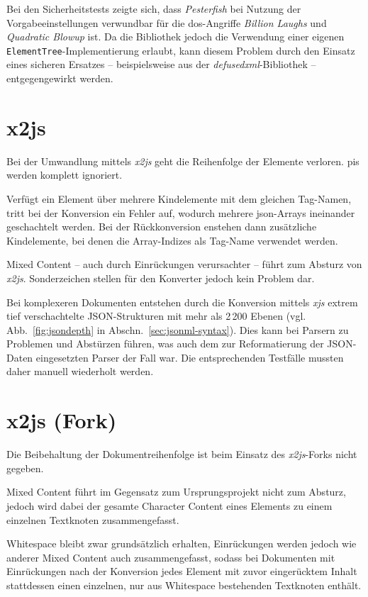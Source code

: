 Bei den Sicherheitstests zeigte sich, dass \emph{Pesterfish} bei Nutzung der Vorgabeeinstellungen verwundbar für die \acrshort{dos}-Angriffe \emph{Billion Laughs} und \emph{Quadratic Blowup} ist. Da die Bibliothek jedoch die Verwendung einer eigenen \texttt{ElementTree}-Implementierung erlaubt, kann diesem Problem durch den Einsatz eines sicheren Ersatzes -- beispielsweise aus der \emph{defusedxml}-Bibliothek -- entgegengewirkt werden.

\section{x2js}
\label{sec:x2js}

Bei der Umwandlung mittels \emph{x2js} geht die Reihenfolge der Elemente verloren. \glspl{pi} werden komplett ignoriert.

Verfügt ein Element über mehrere Kindelemente mit dem gleichen Tag-Namen, tritt bei der Konversion ein Fehler auf, wodurch mehrere \acrshort{json}-Arrays ineinander geschachtelt werden. Bei der Rückkonversion enstehen dann zusätzliche Kindelemente, bei denen die Array-Indizes als Tag-Name verwendet werden.

Mixed Content -- auch durch Einrückungen verursachter -- führt zum Absturz von \emph{x2js}. Sonderzeichen stellen für den Konverter jedoch kein Problem dar.

Bei komplexeren Dokumenten entstehen durch die Konversion mittels \emph{xjs} extrem tief verschachtelte JSON-Strukturen mit mehr als 2\,200 Ebenen (vgl. Abb.~\ref{fig:jsondepth} in Abschn.~\ref{sec:jsonml-syntax}). Dies kann bei Parsern zu Problemen und Abstürzen führen, was auch dem zur Reformatierung der JSON-Daten eingesetzten Parser der Fall war. Die entsprechenden Testfälle mussten daher manuell wiederholt werden.


\section{x2js (Fork)}
\label{sec:x2js-fork}

Die Beibehaltung der Dokumentreihenfolge ist beim Einsatz des \emph{x2js}-Forks nicht gegeben.

Mixed Content führt im Gegensatz zum Ursprungsprojekt nicht zum Absturz, jedoch wird dabei der gesamte Character Content eines Elements zu einem einzelnen Textknoten zusammengefasst.

Whitespace bleibt zwar grundsätzlich erhalten, Einrückungen werden jedoch wie anderer Mixed Content auch zusammengefasst, sodass bei Dokumenten mit Einrückungen nach der Konversion jedes Element mit zuvor eingerücktem Inhalt stattdessen einen einzelnen, nur aus Whitespace bestehenden Textknoten enthält.

